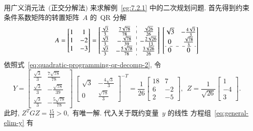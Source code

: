 \begin{exam}\label{eg:7.2.2}
用广义消元法~$($正交分解法$)$ 来求解例~\eqref{eg:7.2.1} 中的二次规划问题. 首先得到约束条件系数矩阵的转置矩阵~$A$ 的~{\rm QR} 分解
\begin{equation*}
A = \begin{bmatrix} 1 & 1 \\ 1 & -2 \\ 1 & -3 \end{bmatrix} = \left[\begin{array}{@{}cc:c@{}} \frac{\sqrt{3}}{3} & \frac{7 \sqrt{78}}{78} & \frac{\sqrt{26}}{26} \\ \frac{\sqrt{3}}{3} & - \frac{\sqrt{78}}{39} & - \frac{2 \sqrt{26}}{13} \\ \frac{\sqrt{3}}{3} & - \frac{5 \sqrt{78}}{78} & \frac{3 \sqrt{26}}{26} \end{array}\right] ~ \left[\begin{array}{@{}cc@{}} \sqrt{3} & - \frac{4 \sqrt{3}}{3} \\ 0 & \frac{\sqrt{78}}{3} \\ \hdashline 0 & 0 \end{array}\right]
\end{equation*}
依照式~\eqref{eq:quadratic-programming-qr-decomp-2}, 令
\begin{equation*}
Y = \left[\begin{matrix} \frac{\sqrt{3}}{3} & \frac{7 \sqrt{78}}{78} \\ \frac{\sqrt{3}}{3} & - \frac{\sqrt{78}}{39} \\ \frac{\sqrt{3}}{3} & - \frac{5 \sqrt{78}}{78} \end{matrix}\right] ~ \left[\begin{matrix} \sqrt{3} & - \frac{4 \sqrt{3}}{3} \\ 0 & \frac{\sqrt{78}}{3} \end{matrix}\right]^{-T} = \frac{1}{26} \left[\begin{matrix} 18 & 7 \\ 6 & -2 \\ 2 & -5 \end{matrix}\right], ~~ Z = \frac{1}{\sqrt{26}} \left[\begin{matrix} 1 \\ -4 \\ 3 \end{matrix}\right].
\end{equation*}
此时, $Z^T G Z = \frac{15}{13} > 0,$ 有唯一解. 代入关于既约变量~$y$ 的线性
方程组~\eqref{eq:general-elim-y} 有
\begin{equation*}

\end{equation*}
\end{exam}
